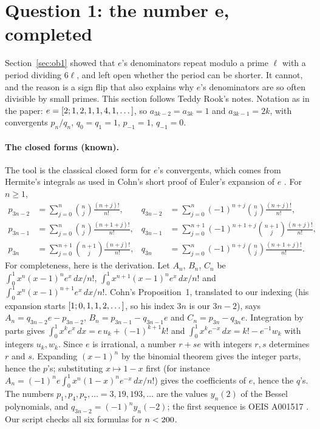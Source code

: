 \section{Question 1: the number e, completed}\label{sec:th2}
\addednote{\revC}

Section~\ref{sec:ob1} showed that $e$'s denominators repeat modulo a prime $\ell$ with a period dividing $6\ell$, and left open whether the period can be shorter. It cannot, and the reason is a sign flip that also explains why $e$'s denominators are so often divisible by small primes. This section follows Teddy Rook's notes. Notation as in the paper: $e = [2; 1, 2, 1, 1, 4, 1, \dots]$, so $a_{3k-2} = a_{3k} = 1$ and $a_{3k-1} = 2k$, with convergents $p_n/q_n$, $q_0 = q_1 = 1$, $p_{-1} = 1$, $q_{-1} = 0$.

\paragraph{The closed forms (known).} The tool is the classical closed form for $e$'s convergents, which comes from Hermite's integrals \citep{Hermite1873} as used in Cohn's short proof of Euler's expansion of $e$ \citep{Cohn2006}. For $n \ge 1$,
\begin{equation}\label{eq:th-closed}
\begin{aligned}
  p_{3n-2} &= \sum_{j=0}^{n}\binom{n}{j}\frac{(n+j)!}{n!}, & q_{3n-2} &= \sum_{j=0}^{n}(-1)^{n+j}\binom{n}{j}\frac{(n+j)!}{n!},\\
  p_{3n-1} &= \sum_{j=0}^{n}\binom{n}{j}\frac{(n+1+j)!}{n!}, & q_{3n-1} &= \sum_{j=0}^{n+1}(-1)^{n+1+j}\binom{n+1}{j}\frac{(n+j)!}{n!},\\
  p_{3n} &= \sum_{j=0}^{n+1}\binom{n+1}{j}\frac{(n+j)!}{n!}, & q_{3n} &= \sum_{j=0}^{n}(-1)^{n+j}\binom{n}{j}\frac{(n+1+j)!}{n!}.
\end{aligned}
\end{equation}
For completeness, here is the derivation. Let $A_n$, $B_n$, $C_n$ be $\int_0^1 x^n(x-1)^ne^x\,dx/n!$, $\int_0^1 x^{n+1}(x-1)^ne^x\,dx/n!$ and $\int_0^1 x^n(x-1)^{n+1}e^x\,dx/n!$. Cohn's Proposition~1, translated to our indexing (his expansion starts $[1; 0, 1, 1, 2, \dots]$, so his index $3n$ is our $3n - 2$), says $A_n = q_{3n-2}e - p_{3n-2}$, $B_n = p_{3n-1} - q_{3n-1}e$ and $C_n = p_{3n} - q_{3n}e$. Integration by parts gives $\int_0^1 x^ke^x\,dx = e\,u_k + (-1)^{k+1}k!$ and $\int_0^1 x^ke^{-x}\,dx = k! - e^{-1}w_k$ with integers $u_k, w_k$. Since $e$ is irrational, a number $r + se$ with integers $r, s$ determines $r$ and $s$. Expanding $(x-1)^n$ by the binomial theorem gives the integer parts, hence the $p$'s; substituting $x \mapsto 1 - x$ first (for instance $A_n = (-1)^ne\int_0^1 x^n(1-x)^ne^{-x}\,dx/n!$) gives the coefficients of $e$, hence the $q$'s. The numbers $p_1, p_4, p_7, \ldots = 3, 19, 193, \ldots$ are the values $y_n(2)$ of the Bessel polynomials, and $q_{3n-2} = (-1)^ny_n(-2)$; the first sequence is OEIS A001517 \citep{OEIS_A001517}. Our script checks all six formulas for $n < 200$.

